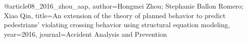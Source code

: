 @article{08_2016_zhou_aap,
  author={Hongmei Zhou; Stephanie Ballon Romero; Xiao Qin},
  title={An extension of the theory of planned behavior to predict pedestrians' violating crossing behavior using structural equation modeling},
  year={2016},
  journal={Accident Analysis and Prevention}
}